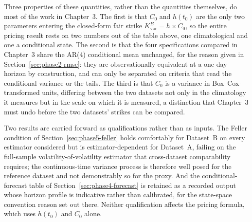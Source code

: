 \documentclass[11pt, a4paper, twoside]{article}
\begin{document}
Three properties of these quantities, rather than the quantities themselves, do most of the work in Chapter~3. The first is that $C_0$ and $h(t_0)$ are the only two parameters entering the closed-form fair strike $K_{\text{var}}^B = h \times C_0$, so the entire pricing result rests on two numbers out of the table above, one climatological and one a conditional state. The second is that the four specifications compared in Chapter~3 share the AR(4) conditional mean unchanged, for the reason given in Section~\ref{sec:phase2-rmse}: they are observationally equivalent at a one-day horizon by construction, and can only be separated on criteria that read the conditional variance or the tails. The third is that $C_0$ is a variance in Box--Cox-transformed units, differing between the two datasets not only in the climatology it measures but in the scale on which it is measured, a distinction that Chapter~3 must undo before the two datasets' strikes can be compared.

Two results are carried forward as qualifications rather than as inputs. The Feller condition of Section~\ref{sec:phase5-feller} holds comfortably for Dataset~B on every estimator considered but is estimator-dependent for Dataset~A, failing on the full-sample volatility-of-volatility estimator that cross-dataset comparability requires; the continuous-time variance process is therefore well posed for the reference dataset and not demonstrably so for the proxy. And the conditional-forecast table of Section~\ref{sec:phase4-forecast} is retained as a recorded output whose horizon profile is indicative rather than calibrated, for the state-space convention reason set out there. Neither qualification affects the pricing formula, which uses $h(t_0)$ and $C_0$ alone.

\newpage

\end{document}
